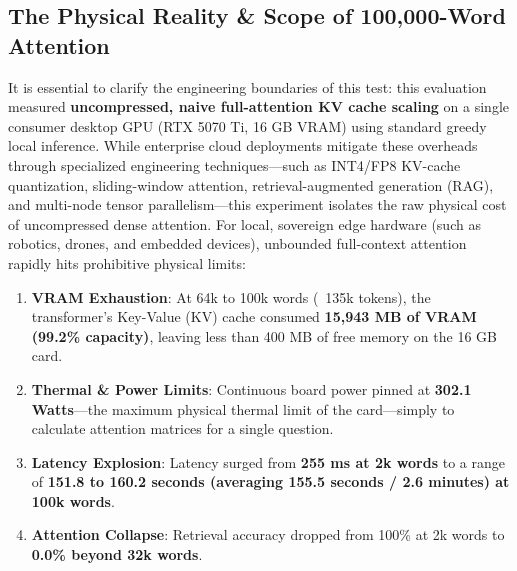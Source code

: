 \documentclass[11pt,a4paper]{article}
\begin{document}
\subsection{The Physical Reality \& Scope of 100,000-Word Attention}
It is essential to clarify the engineering boundaries of this test: this evaluation measured \textbf{uncompressed, naive full-attention KV cache scaling} on a single consumer desktop GPU (RTX 5070 Ti, 16 GB VRAM) using standard greedy local inference. While enterprise cloud deployments mitigate these overheads through specialized engineering techniques---such as INT4/FP8 KV-cache quantization, sliding-window attention, retrieval-augmented generation (RAG), and multi-node tensor parallelism---this experiment isolates the raw physical cost of uncompressed dense attention. For local, sovereign edge hardware (such as robotics, drones, and embedded devices), unbounded full-context attention rapidly hits prohibitive physical limits:
\begin{enumerate}[leftmargin=1.5em, itemsep=1pt, topsep=1pt]
  \item \textbf{VRAM Exhaustion}: At 64k to 100k words (~135k tokens), the transformer's Key-Value (KV) cache consumed \textbf{15,943 MB of VRAM (99.2\% capacity)}, leaving less than 400 MB of free memory on the 16 GB card.
  \item \textbf{Thermal \& Power Limits}: Continuous board power pinned at \textbf{302.1 Watts}---the maximum physical thermal limit of the card---simply to calculate attention matrices for a single question.
  \item \textbf{Latency Explosion}: Latency surged from \textbf{255 ms at 2k words} to a range of \textbf{151.8 to 160.2 seconds (averaging 155.5 seconds / 2.6 minutes) at 100k words}.
  \item \textbf{Attention Collapse}: Retrieval accuracy dropped from 100\% at 2k words to \textbf{0.0\% beyond 32k words}.
\end{enumerate}

\vspace{0.8em}
\end{document}
